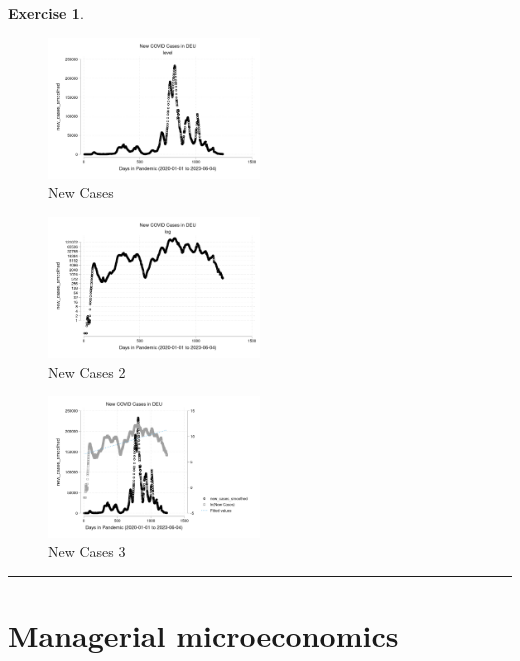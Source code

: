 \documentclass[
  12pt,
  oneside]{book}
\theoremstyle{definition}
\theoremstyle{definition}
\theoremstyle{definition}
\newtheorem{exercise}{Exercise}[chapter]
\theoremstyle{definition}
\theoremstyle{remark}
\begin{document}
\begin{exercise}
\begin{figure}
\centering
\includegraphics[width=0.5\textwidth,height=\textheight]{fig/new.png}
\caption{New Cases}
\end{figure}

\begin{figure}
\centering
\includegraphics[width=0.5\textwidth,height=\textheight]{fig/new2.png}
\caption{New Cases 2}
\end{figure}

\begin{figure}
\centering
\includegraphics[width=0.5\textwidth,height=\textheight]{fig/new3.png}
\caption{New Cases 3}
\end{figure}

\begin{center}\rule{0.5\linewidth}{0.5pt}\end{center}

\end{exercise}

\chapter{Managerial microeconomics}\label{managerial-microeconomics}
\end{document}
